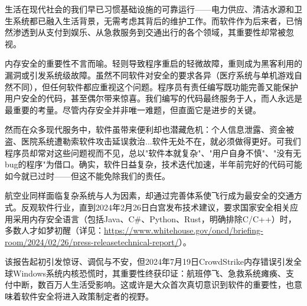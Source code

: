 生活在现代社会的我们早已习惯基础设施的可靠运行——电力供应、清洁水源和卫生系统都已融入生活背景，无需考虑其背后的维护工作。而软件作为后来者，已悄然渗透到从支付到娱乐、从急救服务到交通出行的各个领域，其重要性却常被忽视。

内存安全的重要性不言而喻。轻则导致程序重启的轻微故障，重则成为黑客利用的漏洞或引发系统级故障。虽然不同软件对安全的要求各异（医疗系统与单机游戏自然不同），但任何软件都应重视这个问题。程序员有责任编写既功能完善又能保护用户安全的代码，甚至偶尔带来惊喜。我们编写的代码最终服务于人，而人永远是最重要的考量。尽管内存安全并非唯一难题，但直面它是进步的关键。

然而在众多现代服务中，软件虽带来便利却也潜藏危机：个人信息泄露、资金被盗、医院系统遭勒索软件攻击延误救治...软件无处不在，就必须做得更好。可我们程序员却常对这些问题视而不见，总以"软件本就复杂"、"用户自身不慎"、"没有无bug的程序"为借口。确实，软件日益复杂，技术迭代加速，半年前完好的代码可能如今就已过时——但这不能免除我们的责任。

航空业同样面临复杂系统与人为因素，却通过完善体系使飞行成为最安全的交通方式。反观软件行业，直到2024年2月26日白宫发布技术建议，要求国家安全相关应用采用内存安全语言（包括Java、C\#、Python、Rust，明确排除C/C++）时，多数人才如梦初醒（详见：\url{https://www.whitehouse.gov/oncd/briefing-room/2024/02/26/press-releasetechnical-report/}）。

该报告起初引发惊讶、调侃与不安，但2024年7月19日CrowdStrike内存错误引发全球Windows系统内核恐慌时，其重要性终获印证：航班停飞、急救系统瘫痪、支付中断，数百万人生活受影响。这或许是大众首次真切意识到软件的重要性，也意味着软件安全将进入政策制定者的视野。